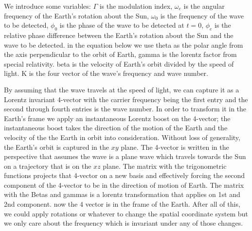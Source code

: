 \documentclass[onecolumn, groupedaddress, 10pt]{revtex4-1}
\begin{document}
We introduce some variables: $\Gamma$ is the modulation index, $\omega_e$ is the angular frequency of the Earth's rotation about the Sun, $\omega_0$ is the frequency of the wave to be detected, $\phi_0$ is the phase of the wave to be detected at $t=0$, $\phi_e$ is the relative phase difference between the Earth's rotation about the Sun and the wave to be detected. in the equation below we use theta as the polar angle from the axis perpendicular to the orbit of Earth, gamma is the lorentz factor from special relativity. beta is the velocity of Earth's orbit divided by the speed of light. K is the four vector of the wave's frequency and wave number.

By assuming that the wave travels at the speed of light, we can capture it as a Lorentz invariant 4-vector with the carrier frequency being the first entry and the second through fourth entries is the wave number. In order to transform it in the Earth's frame we apply an instantaneous Lorentz boost on the 4-vector; the instantaneous boost takes the direction of the motion of the Earth and the velocity of the the Earth in orbit into consideration. Without loss of generality, the Earth's orbit is captured in the $xy$ plane. The 4-vector is written in the perspective that assumes the wave is a plane wave which travels towards the Sun on a trajectory that is on the $xz$ plane. The matrix with the trigonometric functions projects that 4-vector on a new basis and effectively forcing the second component of the 4-vector to be in the direction of motion of Earth. The matrix with the Betas and gammas is a lorentz transformation that applies on 1st and 2nd component. now the 4 vector is in the frame of the Earth. After all of this, we could apply rotations or whatever to change the spatial coordinate system but we only care about the frequency which is invariant under any of those changes.
\end{document}
